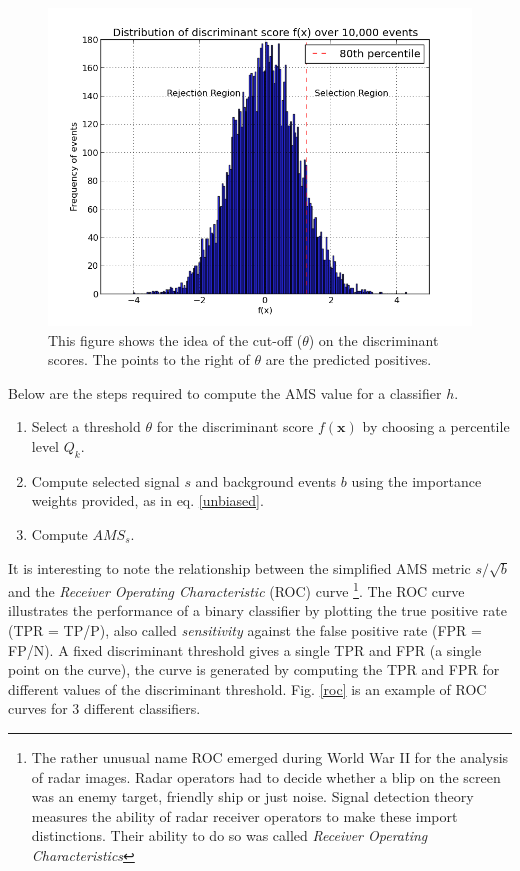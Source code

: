 \documentclass[final,3p,times,twocolumn]{elsarticle}
\begin{document}
\begin{figure}
\hspace{-2mm}
\includegraphics[scale=0.4]{Images/Selection_region.png}
\caption{This figure shows the idea of the cut-off ($\theta$) on the discriminant scores. The points to the right of $\theta$ are the predicted positives.}
\end{figure}

Below are the steps required to compute the AMS value for a classifier $h$.
\begin{enumerate}
\item Select a threshold $\theta$ for the discriminant score $f(\textbf{x})$ by choosing a percentile level $Q_{k}$.
\item Compute selected signal $s$ and background events $b$ using the importance weights provided, as in eq. \ref{unbiased}. 
\item Compute $AMS_{s}$.
\end{enumerate}

It is interesting to note the relationship between the simplified AMS metric $s/\sqrt{b}$ and the \textit{Receiver Operating Characteristic} (ROC) curve \footnote{The rather unusual name ROC emerged during World War II for the analysis of radar images. Radar operators had to decide whether a blip on the screen was an enemy target, friendly ship or just noise. Signal detection theory measures the ability of radar receiver operators to make these import distinctions. Their ability to do so was called \textit{Receiver Operating Characteristics}}.  The ROC curve illustrates the performance of a binary classifier by plotting the true positive rate (TPR = TP/P), also called \textit{sensitivity} against the false positive rate (FPR = FP/N). A fixed discriminant threshold gives a single TPR and FPR (a single point on the curve), the curve is generated by computing the TPR and FPR for different values of the discriminant threshold. Fig. \ref{roc} is an example of ROC curves for 3 different classifiers. 
\end{document}
